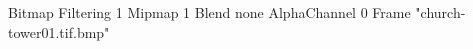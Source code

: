 {Bitmap
	{Filtering 1}
	{Mipmap 1}
	{Blend none}
	{AlphaChannel 0}
	{Frame "church-tower01.tif.bmp"}
}
